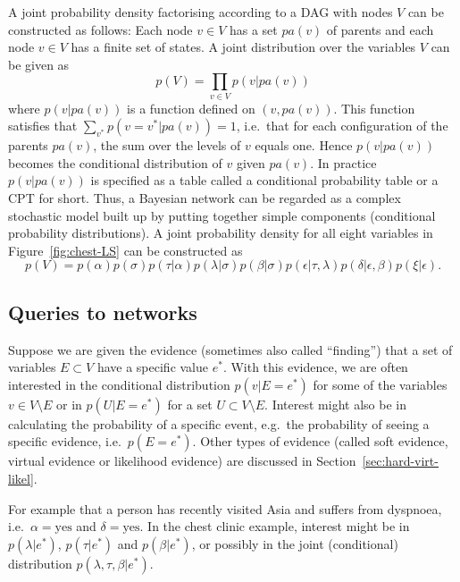 \documentclass[10pt]{article}\usepackage[]{graphicx}\usepackage[]{xcolor}
\begin{document}
A joint probability density factorising according to a DAG with nodes
$V$ can be constructed as follows: Each node $v\in V$ has a set $pa(v)$ of parents and each node
$v\in V$ has a finite set of states. A joint distribution
over the variables $V$ can be given as
\begin{equation}
  \label{eq:dagfact1}
  p(V) = \prod_{v\in V} p(v|pa(v))
\end{equation}
where $p(v|pa(v))$ is a function defined on $(v,pa(v))$. This function
satisfies that $\sum_{v^*} p(v=v^*|pa(v))=1$, i.e.\ that
for each configuration of the parents $pa(v)$, the sum
over the levels of $v$ equals one. Hence $p(v|pa(v))$ becomes the
conditional distribution of $v$ given $pa(v)$.
In practice $p(v|pa(v))$ is specified as a table called a conditional
probability table or a CPT for short.
Thus, a Bayesian network can be regarded as a complex stochastic model built up by
putting together simple components (conditional probability
distributions).
A joint probability density for all eight variables in
Figure~\ref{fig:chest-LS}
can be constructed as 
\begin{equation}
  \label{eq:chestfact1}
  p(V) =
  p(\alpha)p(\sigma)p(\tau|\alpha)p(\lambda|\sigma)p(\beta|\sigma)p(\epsilon|\tau,\lambda)
  p(\delta|\epsilon, \beta)p(\xi|\epsilon).
\end{equation}



\subsection{Queries to networks}
\label{sec:xxx}

Suppose we are given the evidence (sometimes also called ``finding'')
that a set of variables $E\subset V$
have a specific value $e^*$.
With this evidence, we are often interested in the conditional
distribution $p(v|E=e^*)$
for some of the variables $v \in V \setminus E$
or in $p(U|E=e^*)$
for a set $U\subset V \setminus E$. Interest might also be in
calculating the probability of a specific event, e.g.\ the probability
of seeing a specific evidence, i.e.\ $p(E=e^*)$.
Other types of evidence (called soft evidence, virtual evidence or likelihood evidence) are discussed in
Section~\ref{sec:hard-virt-likel}.

For
example that a person has recently visited Asia and suffers from
dyspnoea, i.e.\ $\alpha=\mbox{yes}$ and $\delta=\mbox{yes}$.
In the chest clinic example, interest might be in $p(\lambda|e^*)$, $p(\tau|e^*)$
and  $p(\beta|e^*)$, or possibly in the joint (conditional) distribution
$p(\lambda,\tau,\beta|e^*)$.
\end{document}
